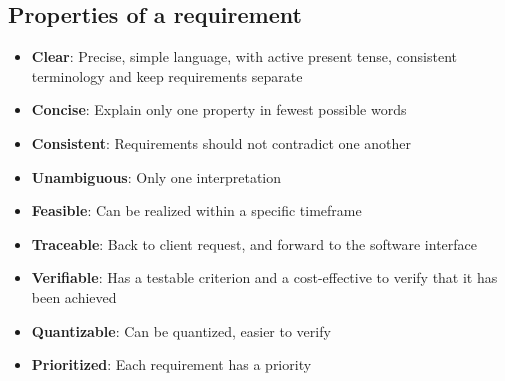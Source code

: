 \documentclass{article}
\begin{document}
\subsection{Properties of a requirement}
\begin{itemize}
    \item \textbf{Clear}: Precise, simple language, with active present tense, consistent terminology and keep requirements separate
    
    \item \textbf{Concise}: Explain only one property in fewest possible words
    
    \item \textbf{Consistent}: Requirements should not contradict one another
    
    \item \textbf{Unambiguous}: Only one interpretation
    
    \item \textbf{Feasible}: Can be realized within a specific timeframe
    
    \item \textbf{Traceable}: Back to client request, and forward to the software interface
    
    \item \textbf{Verifiable}: Has a testable criterion and a cost-effective to verify that it has been achieved
    
    \item \textbf{Quantizable}: Can be quantized, easier to verify
    
    \item \textbf{Prioritized}: Each requirement has a priority
\end{itemize}
\end{document}
